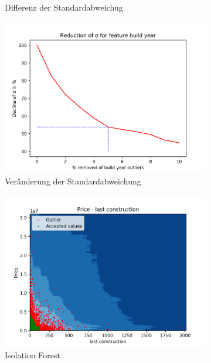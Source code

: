 \begin{figure}[H]
\begin{subfigure}{.5\textwidth}
  \caption{Differenz der Standardabweichug} 
\end{subfigure}
\begin{subfigure}{.5\textwidth}
  \centering
  \includegraphics[width=\linewidth]{images/anhang/outlier_detection/build_year_std.png}
  \caption{Veränderung der Standardabweichung} 
\end{subfigure}
\begin{subfigure}{.5\textwidth}
  \centering
  \includegraphics[width=\linewidth]{images/anhang/outlier_detection/last_construction_IsolationForest.png}
  \caption{Isolation Forest}
\end{subfigure}
\begin{subfigure}{.5\textwidth}
  \centering

\end{subfigure}
\end{figure}
